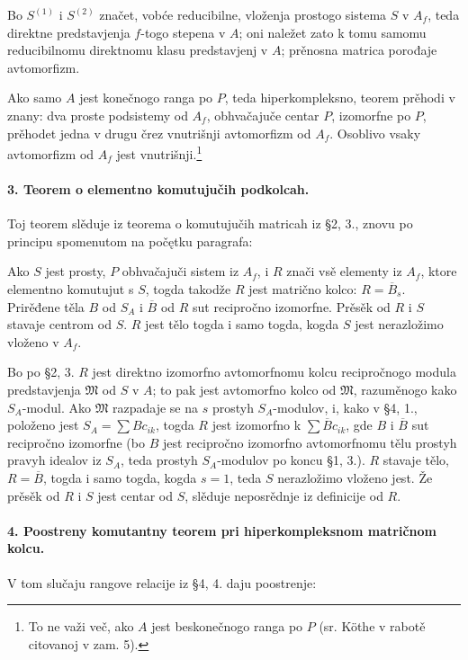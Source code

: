 \documentclass[11pt]{article}
\providecommand{\frM}{\mathfrak M}
\begin{document}
Bo \(S^{(1)}\) i \(S^{(2)}\) značet, vobće reducibilne, vloženja prostogo sistema \(S\) v \(A_f\), teda direktne predstavjenja \(f\)-togo stepena v \(A\); oni naležet zato k tomu samomu reducibilnomu direktnomu klasu predstavjenj v \(A\); prěnosna matrica porođaje avtomorfizm.

Ako samo \(A\) jest konečnogo ranga po \(P\), teda hiperkompleksno, teorem prěhodi v znany: dva proste podsistemy od \(A_f\), obhvačajuče centar \(P\), izomorfne po \(P\), prěhodet jedna v drugu črez vnutrišnji avtomorfizm od \(A_f\). Osoblivo vsaky avtomorfizm od \(A_f\) jest vnutrišnji.\footnote{To ne važi več, ako \(A\) jest beskonečnogo ranga po \(P\) (sr. Köthe v rabotě citovanoj v zam. 5).}

\paragraph{3. Teorem o elementno komutujučih podkolcah.}
Toj teorem slěduje iz teorema o komutujučih matricah iz §2, 3., znovu po principu spomenutom na počętku paragrafa:

Ako \(S\) jest prosty, \(P\) obhvačajuči sistem iz \(A_f\), i \(R\) znači vsě elementy iz \(A_f\), ktore elementno komutujut s \(S\), togda takodže \(R\) jest matrično kolco: \(R=\overline B_s\). Prirěđene těla \(B\) od \(S_A\) i \(\overline B\) od \(R\) sut recipročno izomorfne. Prěsěk od \(R\) i \(S\) stavaje centrom od \(S\). \(R\) jest tělo togda i samo togda, kogda \(S\) jest nerazložimo vloženo v \(A_f\).

Bo po §2, 3. \(R\) jest direktno izomorfno avtomorfnomu kolcu recipročnogo modula predstavjenja \(\frM\) od \(S\) v \(A\); to pak jest avtomorfno kolco od \(\frM\), razuměnogo kako \(S_A\)-modul. Ako \(\frM\) razpadaje se na \(s\) prostyh \(S_A\)-modulov, i, kako v §4, 1., položeno jest \(S_A=\sum Bc_{ik}\), togda \(R\) jest izomorfno k \(\sum \overline Bc_{ik}\), gde \(B\) i \(\overline B\) sut recipročno izomorfne (bo \(B\) jest recipročno izomorfno avtomorfnomu tělu prostyh pravyh idealov iz \(S_A\), teda prostyh \(S_A\)-modulov po koncu §1, 3.). \(R\) stavaje tělo, \(R=\overline B\), togda i samo togda, kogda \(s=1\), teda \(S\) nerazložimo vloženo jest. Že prěsěk od \(R\) i \(S\) jest centar od \(S\), slěduje neposrědnje iz definicije od \(R\).

\paragraph{4. Poostreny komutantny teorem pri hiperkompleksnom matričnom kolcu.}
V tom slučaju rangove relacije iz §4, 4. daju poostrenje:
\end{document}
